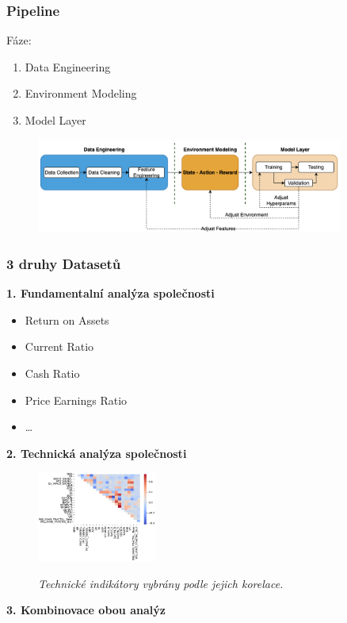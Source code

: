 \begin{frame}
    \frametitle{Pipeline}
    {\Large Fáze:}
    \begin{enumerate}
        \item Data Engineering
        \item Environment Modeling
        \item Model Layer
    \end{enumerate}
    \begin{center}
        \begin{figure}
            \centering
            \includegraphics[width=0.9\textwidth]{img/navrh_reseni}
        \end{figure}
    \end{center}
\end{frame}

\begin{frame}
    \frametitle{3 druhy Datasetů}
    \begin{multicols}{2}
        \begin{center}
            \textbf{1. Fundamentalní analýza společnosti}
            \begin{itemize}
                \item Return on Assets
                \item Current Ratio
                \item Cash Ratio
                \item Price Earnings Ratio
                \item \ldots
            \end{itemize}
        \end{center}
        \columnbreak
        \begin{center}
            \textbf{2. Technická analýza společnosti}
            \begin{figure}
                \centering
                \includegraphics[width=0.35\textwidth]{img/corr}

                \textit{\small Technické indikátory vybrány podle jejich korelace.}
            \end{figure}
        \end{center}
    \end{multicols}
    \textbf{3. Kombinovace obou analýz}
\end{frame}

